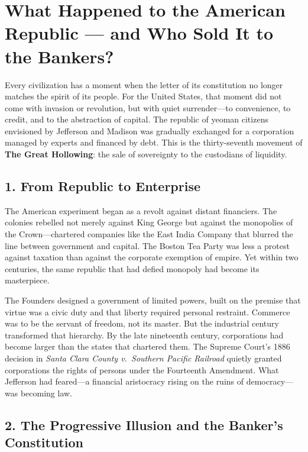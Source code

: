 \documentclass[11pt,twoside]{book}
\begin{document}
% 
\chapter{What Happened to the American Republic — and Who Sold It to the Bankers?}
\label{ch:37}

Every civilization has a moment when the letter of its constitution no longer matches the spirit of its people.  
For the United States, that moment did not come with invasion or revolution, but with quiet surrender—to convenience, to credit, and to the abstraction of capital.  
The republic of yeoman citizens envisioned by Jefferson and Madison was gradually exchanged for a corporation managed by experts and financed by debt.  
This is the thirty-seventh movement of \textbf{The Great Hollowing}: the sale of sovereignty to the custodians of liquidity.

\section*{1. From Republic to Enterprise}

The American experiment began as a revolt against distant financiers.  
The colonies rebelled not merely against King George but against the monopolies of the Crown—chartered companies like the East India Company that blurred the line between government and capital.  
The Boston Tea Party was less a protest against taxation than against the corporate exemption of empire.  
Yet within two centuries, the same republic that had defied monopoly had become its masterpiece.

The Founders designed a government of limited powers, built on the premise that virtue was a civic duty and that liberty required personal restraint.  
Commerce was to be the servant of freedom, not its master.  
But the industrial century transformed that hierarchy.  
By the late nineteenth century, corporations had become larger than the states that chartered them.  
The Supreme Court’s 1886 decision in \textit{Santa Clara County v.~Southern Pacific Railroad} quietly granted corporations the rights of persons under the Fourteenth Amendment.  
What Jefferson had feared—a financial aristocracy rising on the ruins of democracy—was becoming law.

\section*{2. The Progressive Illusion and the Banker’s Constitution}
\end{document}
